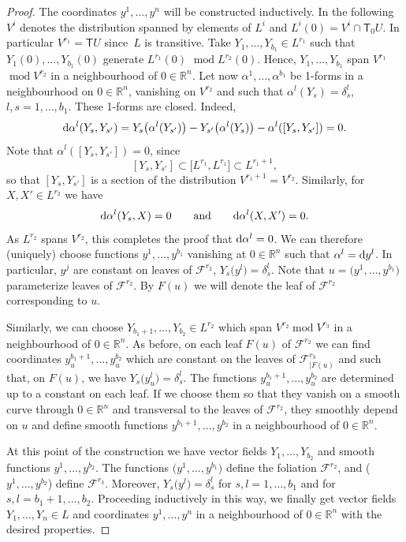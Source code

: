 \documentclass[pdftex]{sigma}
\numberwithin{equation}{section}
\begin{document}
\begin{proof} The coordinates $y^1,\ldots, y^n$ will be constructed inductively. In the following $V^i$ denotes the distribution spanned by elements of $L^i$ and $L^i(0)=V^i\cap{\mathsf T}_0 U$. In particular $V^{r_1}={\mathsf T} U$ since~$L$ is transitive.
Take $Y_1,\dots,Y_{b_1}\in L^{r_1}$ such that $Y_1(0),\dots,Y_{b_1}(0)$ generate $L^{r_1}(0)$ $\operatorname{mod} L^{r_2}(0)$. Hence, $Y_1,\dots,Y_{b_1}$ span $V^{r_1}$ $\operatorname{mod} V^{r_2}$ in a neighbourhood of $0\in{\mathbb R}^n$.
Let now $\alpha^1,\dots,\alpha^{b_1}$ be 1-forms in a neighbourhood on $0\in{\mathbb R}^n$, vanishing on $V^{r_2}$ and such that
$\alpha^l(Y_s)=\delta^l_s$, $l,s=1,\dots, b_1$. These 1-forms are closed. Indeed,
\[ {\rm d}\alpha^l(Y_s,Y_{s'})=Y_s\big(\alpha^l(Y_{s'})\big)- Y_{s'}\big(\alpha^l(Y_{s})\big)-\alpha^l([Y_s,Y_{s'}])=0 .\] Note that $\alpha^l([Y_s,Y_{s'}])=0$, since
\[ [Y_s,Y_{s'}]\subset \big[L^{r_1},L^{r_1}\big]\subset L^{r_1+1},\]
so that $[Y_s,Y_{s'}]$ is a section of the distribution $V^{r_1+1}=V^{r_2}$.
Similarly, for $X,X'\in L^{r_2}$ we have
\[ {\rm d}\alpha^l(Y_s,X)=0 \qquad\text{and}\qquad {\rm d}\alpha^l(X,X')=0 .\]
As $L^{r_2}$ spans $V^{r_2}$, this completes the proof that ${\rm d}\alpha^l=0$.
We can therefore (uniquely) choose functions $y^1,\dots,y^{b_1}$ vanishing at $0\in{\mathbb R}^n$ such that $\alpha^l={\rm d} y^l$. In particular, $y^j$ are constant on leaves of ${\mathcal F}^{r_2}$, $Y_s\big(y^l\big)=\delta^l_s$. Note that $u=\big(y^1,\ldots, y^{b_1}\big)$ parameterize leaves of ${\mathcal F}^{r_2}$. By $F(u)$ we will denote the leaf of ${\mathcal F}^{r_2}$ corresponding to $u$.

Similarly, we can choose $Y_{b_1+1},\dots,Y_{b_2}\in L^{r_2}$ which span $V^{r_2} \operatorname{mod} V^{r_3}$ in a neighbourhood of $0\in{\mathbb R}^n$. As before, on each leaf $F(u)$ of ${\mathcal F}^{r_2}$ we can find coordinates $y^{b_1+1}_u,\dots,y_u^{b_2}$ which are constant on the leaves of ${\mathcal F}^{r_3}_{|F(u)}$ and such that, on $F(u)$, we have $Y_s\big(y^l_u\big)=\delta^l_s$. The functions $y^{b_1+1}_u,\dots,y_u^{b_2}$ are determined up to a constant on each leaf. If we choose them so that they vanish on a smooth curve through $0\in{\mathbb R}^n$ and transversal to the leaves of ${\mathcal F}^{r_2}$, they smoothly depend on $u$ and define smooth functions $y^{b_1+1},\dots,y^{b_2}$ in a neighbourhood of $0\in{\mathbb R}^n$.

At this point of the construction we have vector fields $Y_1,\dots,Y_{b_2}$ and smooth functions $y^1,\dots,y^{b_2}$. The functions $\big(y^1,\dots,y^{b_1}\big)$ define the foliation ${\mathcal F}^{r_2}$, and ($y^1,\dots,y^{b_2}$) define ${\mathcal F}^{r_3}$. Moreover, $Y_s\big(y^l\big)=\delta^l_s$ for $s,l=1,\dots,b_1$ and for $s,l=b_1+1,\dots,b_2$.
Proceeding inductively in this way, we finally get vector fields $Y_1,\dots,Y_n\in L$ and coordinates $y^1,\dots,y^n$ in a neighbourhood of $0\in{\mathbb R}^n$ with the desired properties.


\end{proof}
\end{document}
